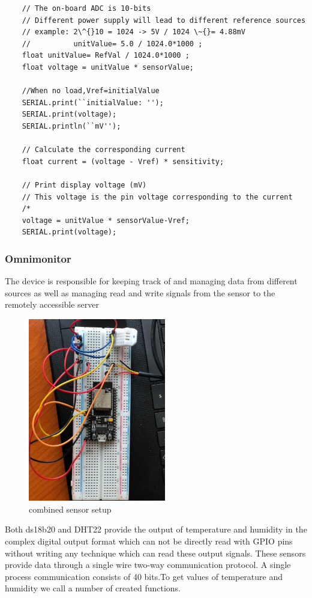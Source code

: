 \begin{lstlisting}
	// The on-board ADC is 10-bits 
	// Different power supply will lead to different reference sources
	// example: 2\^{}10 = 1024 -> 5V / 1024 \~{}= 4.88mV
	//          unitValue= 5.0 / 1024.0*1000 ;
	float unitValue= RefVal / 1024.0*1000 ;
	float voltage = unitValue * sensorValue; 
	
	//When no load,Vref=initialValue
	SERIAL.print(``initialValue: '');
	SERIAL.print(voltage);
	SERIAL.println(``mV''); 
	
	// Calculate the corresponding current
	float current = (voltage - Vref) * sensitivity;
	
	// Print display voltage (mV)
	// This voltage is the pin voltage corresponding to the current
	/*
	voltage = unitValue * sensorValue-Vref;
	SERIAL.print(voltage);
\end{lstlisting}
 

\subsubsection{Omnimonitor}

The device is responsible for keeping track of and managing data from different sources as well as managing read and write signals from the sensor to the remotely accessible server  
\begin{figure}[!h]
	\centering
	\includegraphics[width=0.7\linewidth, height = 8cm]{Figures/setup}
	\caption{combined sensor setup}
	
\end{figure}
Both ds18b20 and DHT22 provide the output of temperature and humidity in the complex digital output format which can not be directly read with GPIO pins without writing any technique which can read these output signals. These sensors provide data through a single wire two-way communication protocol. A single process communication consists of 40 bits.To get values of temperature and humidity we call a number of created  functions.

